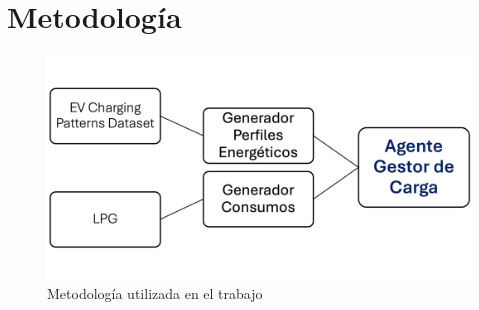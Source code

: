 \chapter{Metodología}
\begin{figure}[h!]
    \centering
    \includegraphics[width=1\textwidth]{images/metodologia.png}
    \caption{Metodología utilizada en el trabajo}
    \label{fig:metodologia}
\end{figure}

